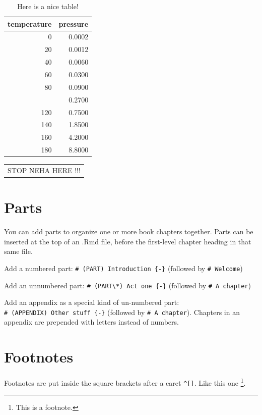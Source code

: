\documentclass[
]{book}
\theoremstyle{definition}
\theoremstyle{definition}
\theoremstyle{definition}
\theoremstyle{definition}
\theoremstyle{remark}
\begin{document}
\begin{table}

\caption{\label{tab:nice-tab}Here is a nice table!}
\centering
\begin{tabular}[t]{rr}
\toprule
temperature & pressure\\
\midrule
0 & 0.0002\\
20 & 0.0012\\
40 & 0.0060\\
60 & 0.0300\\
80 & 0.0900\\
\addlinespace
100 & 0.2700\\
120 & 0.7500\\
140 & 1.8500\\
160 & 4.2000\\
180 & 8.8000\\
\bottomrule
\end{tabular}
\end{table}

\begin{longtable}[]{@{}l@{}}
\toprule\noalign{}
\endhead
\bottomrule\noalign{}
\endlastfoot
STOP NEHA HERE !!! \\
\end{longtable}

\section{Parts}\label{parts}

You can add parts to organize one or more book chapters together. Parts can be inserted at the top of an .Rmd file, before the first-level chapter heading in that same file.

Add a numbered part: \texttt{\#\ (PART)\ Introduction\ \{-\}} (followed by \texttt{\#\ Welcome})

Add an unnumbered part: \texttt{\#\ (PART\textbackslash{}*)\ Act\ one\ \{-\}} (followed by \texttt{\#\ A\ chapter})

Add an appendix as a special kind of un-numbered part: \texttt{\#\ (APPENDIX)\ Other\ stuff\ \{-\}} (followed by \texttt{\#\ A\ chapter}). Chapters in an appendix are prepended with letters instead of numbers.

\section{Footnotes}\label{footnotes}

Footnotes are put inside the square brackets after a caret \texttt{\^{}{[}{]}}. Like this one \footnote{This is a footnote.}.
\end{document}
